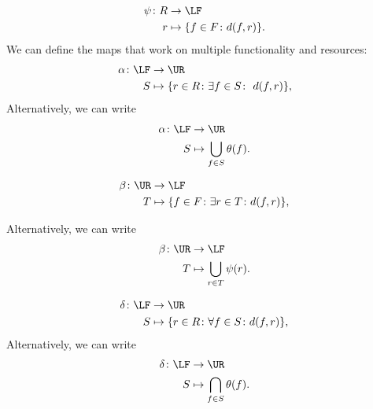 \begin{equation}
    \begin{aligned}
    \psi\colon R&\to \LF\\
    r&\mapsto \{f\in F \colon d(f, r) \}.
    \end{aligned}
\end{equation}
We can define the maps that work on multiple functionality 
and resources:
\begin{equation}
\label{eq:galoisalfa}
    \begin{aligned}
    \alpha\colon \LF&\to \UR\\
    S&\mapsto \{r\in R \colon \exists f\in S\colon \ d(f,r)\},
    \end{aligned}
\end{equation}
Alternatively, we can write 
\begin{equation}
\begin{aligned}
\alpha \colon \LF &\to \UR \\
S&\mapsto \bigcup_{f\in S} \theta(f).
\end{aligned}
\end{equation}

\begin{equation}
\label{eq:galoisbeta}
    \begin{aligned}
    \beta\colon \UR&\to \LF\\
    T&\mapsto \{f\in F  \colon \exists r\in T\colon d(f,r)\},
    \end{aligned}
\end{equation}

\noindent Alternatively, we can write
\begin{equation}
\begin{aligned}
\beta \colon \UR &\to \LF \\
T&\mapsto \bigcup_{r\in T} \psi(r).
\end{aligned}
\end{equation}

\begin{equation}
\label{eq:galoisdelta}
    \begin{aligned}
    \delta \colon \LF&\to \UR\\
    S&\mapsto \{r\in R \colon \forall {f\in S}\colon d(f,r)\},
    \end{aligned}
\end{equation}
Alternatively, we can write
\begin{equation}
    \begin{aligned}
    \delta\colon \LF &\to \UR\\
    S&\mapsto \bigcap_{f\in S}\theta(f).
    \end{aligned}
\end{equation}

